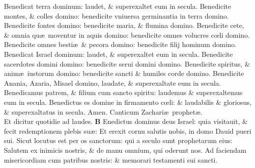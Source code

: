 \documentclass[a5paper,10pt]{book}
\def\ae{æ}
\def\oe{œ}
\begin{document}
\begin{multicols*}{2}
\newline \color{red} B\color{black}enedicat terra dominum: laudet, \& superexaltet eum in secula.
\newline \color{red} B\color{black}enedicite montes, \& colles domino: benedicite vniuersa germinantia in terra domino.
\newline \color{red} B\color{black}enedicite fontes domino: benedicite maria, \& flumina domino.
\newline \color{red} B\color{black}enedicite cete, \& omnia qu\ae \ moventur in aquis domino: benedicite omnes volucres c\oe li domino.
\newline \color{red} B\color{black}enedicite omnes besti\ae \ \& pecora domino: benedicite filij hominum domino.
\newline \color{red} B\color{black}enedicat Israel dominum: laudet, \& superexaltet eum in secula.
\newline \color{red} B\color{black}enedicite sacerdotes domini domino: benedicite serui domini domino.
\newline \color{red} B\color{black}enedicite spiritus, \& anim\ae \ iustorum domino: benedicite sancti \& humiles corde domino.
\newline \color{red} B\color{black}enedicite Anania, Azaria, Misael domino, laudate, \& superexaltate eum in secula.
\newline \color{red} B\color{black}enedicamus patrem, \& filium cum sancto spiritu: laudemus \& superexaltemus eum in secula.
\newline \color{red} B\color{black}enedictus es domine in firmamento c\oe li: \& laudabilis \& gloriosus, \& superexaltatus in secula. Amen.
\newline {} \color{red} Canticum Zachari\ae \ prophet\ae .\\Et dicitur quotidie ad laudes. \color{black}
\vspace{-1em}
\lettrine[lines=2]{\bfseries \color{red} B}{}
Enedictus dominus deus Israel: quia visitauit, \& fecit redemptionem plebis su\ae :
\newline \color{red} E\color{black}t erexit cornu salutis nobis, in domo Dauid pueri sui.
\newline \color{red} S\color{black}icut locutus est per os sanctorum: qui a seculo sunt prophetarum eius:
\newline \color{red} S\color{black}alutem ex inimicis nostris, \& de manu omnium, qui oderunt nos.
\newline \color{red} A\color{black}d faciendam misericordiam cum patribus nostris: \& memorari testamenti sui sancti.

\end{multicols*}
\end{document}
